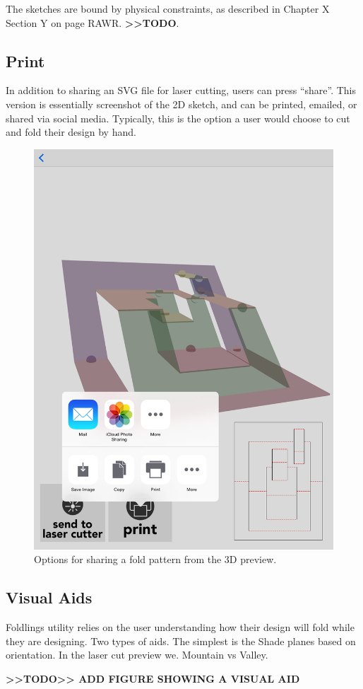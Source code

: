The sketches are bound by physical constraints, as described in Chapter
X Section Y on page RAWR. \textbf{\textgreater{}\textgreater{}TODO}.

\subsection{Print}\label{print}

In addition to sharing an SVG file for laser cutting, users can press
``share''. This version is essentially screenshot of the 2D sketch, and
can be printed, emailed, or shared via social media. Typically, this is
the option a user would choose to cut and fold their design by hand.

\begin{figure}[htbp]
\centering
\includegraphics{figures/32_UI_Tool_Interactions/3d-share.png}
\caption{Options for sharing a fold pattern from the 3D preview.}
\end{figure}

\subsection{Visual Aids}\label{visual-aids}

Foldlings utility relies on the user understanding how their design will
fold while they are designing. Two types of aids. The simplest is the
Shade planes based on orientation. In the laser cut preview we. Mountain
vs Valley.

\textbf{\textgreater{}\textgreater{}TODO\textgreater{}\textgreater{} ADD
FIGURE SHOWING A VISUAL AID}

